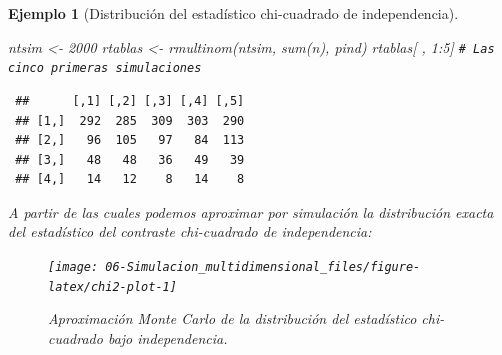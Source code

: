 \documentclass[
  10pt,
]{book}
\newenvironment{Shaded}{\begin{snugshade}}{\end{snugshade}}
\newcommand{\AttributeTok}[1]{\textcolor[rgb]{0.77,0.63,0.00}{#1}}
\newcommand{\CommentTok}[1]{\textcolor[rgb]{0.56,0.35,0.01}{\textit{#1}}}
\newcommand{\ConstantTok}[1]{\textcolor[rgb]{0.00,0.00,0.00}{#1}}
\newcommand{\ControlFlowTok}[1]{\textcolor[rgb]{0.13,0.29,0.53}{\textbf{#1}}}
\newcommand{\DecValTok}[1]{\textcolor[rgb]{0.00,0.00,0.81}{#1}}
\newcommand{\FunctionTok}[1]{\textcolor[rgb]{0.00,0.00,0.00}{#1}}
\newcommand{\NormalTok}[1]{#1}
\newcommand{\OtherTok}[1]{\textcolor[rgb]{0.56,0.35,0.01}{#1}}
\newcommand{\SpecialCharTok}[1]{\textcolor[rgb]{0.00,0.00,0.00}{#1}}
\newcommand{\StringTok}[1]{\textcolor[rgb]{0.31,0.60,0.02}{#1}}
\theoremstyle{break}
\newtheorem{example}{Ejemplo}[chapter]
\theoremstyle{nonumberplain}
\renewcommand{\CommentTok}[1]{\textcolor[rgb]{0.41,0.41,0.41}{\texttt{#1}}}
\begin{document}
\begin{example}[Distribución del estadístico chi-cuadrado de independencia]
\begin{Shaded}
\begin{Highlighting}[]
\NormalTok{ntsim }\OtherTok{\textless{}{-}} \DecValTok{2000}
\NormalTok{rtablas }\OtherTok{\textless{}{-}} \FunctionTok{rmultinom}\NormalTok{(ntsim, }\FunctionTok{sum}\NormalTok{(n), pind)}
\NormalTok{rtablas[ , }\DecValTok{1}\SpecialCharTok{:}\DecValTok{5}\NormalTok{] }\CommentTok{\# Las cinco primeras simulaciones}
\end{Highlighting}
\end{Shaded}

\begin{verbatim}
 ##      [,1] [,2] [,3] [,4] [,5]
 ## [1,]  292  285  309  303  290
 ## [2,]   96  105   97   84  113
 ## [3,]   48   48   36   49   39
 ## [4,]   14   12    8   14    8
\end{verbatim}

A partir de las cuales podemos aproximar por simulación la distribución exacta del estadístico del contraste chi-cuadrado de independencia:

\begin{Shaded}
\end{Shaded}

\begin{figure}[!htbp]

{\centering \texttt{[image: 06-Simulacion\_multidimensional\_files/figure-latex/chi2-plot-1]} 

}

\caption{Aproximación Monte Carlo de la distribución del estadístico chi-cuadrado bajo independencia.}\label{fig:chi2-plot}
\end{figure}


\end{example}
\end{document}
